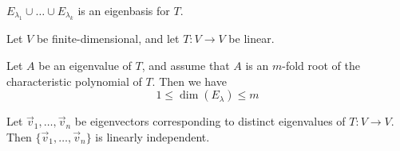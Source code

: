 \documentclass[11pt,fleqn]{book} %
\begin{document}
$E_{\lambda_1} \cup \dots \cup E_{\lambda_k}$ is an eigenbasis for $T$.

\setcounter{chapter}{4}
\setcounter{dummy}{5}
\begin{proposition}
    Let $V$ be finite-dimensional, and let $T: V \to V$ be linear.

    Let $A$ be an eigenvalue of $T$, and assume that $A$ is an $m$-fold root of the characteristic polynomial of $T$. Then we have $$1 \le \dim(E_\lambda) \le m$$
\end{proposition}

\setcounter{dummy}{3}
\begin{proposition}
    Let $\vec{v}_1, \dots, \vec{v}_n$ be eigenvectors corresponding to distinct eigenvalues of $T: V \to V$. Then $\{ \vec{v}_1, \dots, \vec{v}_n \}$  is linearly independent.
\end{proposition}
\setcounter{chapter}{3}
\end{document}
